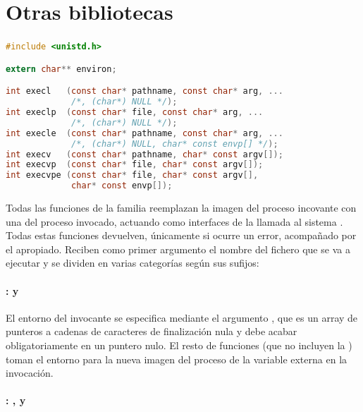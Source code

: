 \chapter{Otras bibliotecas}

\subsection{}\label{exec}

\begin{lstlisting}[language=C]
#include <unistd.h>

extern char** environ;

int execl   (const char* pathname, const char* arg, ...
             /*, (char*) NULL */);
int execlp  (const char* file, const char* arg, ...
             /*, (char*) NULL */);
int execle  (const char* pathname, const char* arg, ...
             /*, (char*) NULL, char* const envp[] */);
int execv   (const char* pathname, char* const argv[]);
int execvp  (const char* file, char* const argv[]);
int execvpe (const char* file, char* const argv[],
             char* const envp[]);
\end{lstlisting}

Todas las funciones de la familia  reemplazan la imagen del proceso incovante con una del proceso invocado, actuando como interfaces de la llamada al sistema .
Todas estas funciones devuelven, únicamente si ocurre un error,  acompañado por el  apropiado.
Reciben como primer argumento el nombre del fichero que se va a ejecutar y se dividen en varias categorías según sus sufijos:

\subsubsection{:  y }

El entorno del invocante se especifica mediante el argumento , que es un array de punteros a cadenas de caracteres de finalización nula y debe acabar obligatoriamente en un puntero nulo.
El resto de funciones  (que no incluyen la ) toman el entorno para la nueva imagen del proceso de la variable externa  en la invocación.

\subsubsection{: , y }

